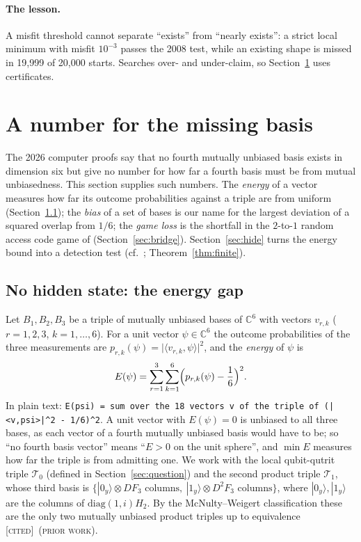 \documentclass[11pt]{article}
\newcommand{\C}{\mathbb{C}}
\newcommand{\ip}[2]{\langle #1,#2\rangle}
\newcommand{\abs}[1]{\lvert #1\rvert}
\newcommand{\Tz}{\mathcal{T}_0}          %
\newcommand{\To}{\mathcal{T}_1}          %
\newcommand{\E}{E}                       %
\newcommand{\st}[1]{\textsc{[#1]}}
\newcommand{\stcited}{\st{cited}}
\newcommand{\prior}{\textsc{(prior work)}}
\theoremstyle{definition}
\theoremstyle{remark}
\begin{document}
\paragraph{The lesson.} A misfit threshold cannot separate ``exists'' from ``nearly exists'': a strict local minimum with
misfit $10^{-3}$ passes the 2008 test, while an existing shape is missed in 19{,}999 of 20{,}000 starts. Searches over- and
under-claim, so Section~\ref{sec:number} uses certificates.

\section{A number for the missing basis}\label{sec:number}

The 2026 computer proofs say that no fourth mutually unbiased basis exists in dimension six but give no
number for how far a fourth basis must be from mutual unbiasedness. This section supplies such numbers. The
\emph{energy} of a vector measures how far its outcome probabilities against a triple are from uniform
(Section~\ref{sec:gap}); the \emph{bias} of a set of bases is our name for the largest deviation of a squared overlap
from $1/6$; the \emph{game loss} is the shortfall in the $2$-to-$1$ random access code game of \cite{ABMP}
(Section~\ref{sec:bridge}). Section~\ref{sec:hide} turns the energy bound into a detection test
(cf.\ \cite{GMMP17}; Theorem~\ref{thm:finite}).

\subsection{No hidden state: the energy gap}\label{sec:gap}

{\raggedright Let $B_1,B_2,B_3$ be a triple of mutually unbiased bases of $\C^6$ with vectors $v_{r,k}$ ($r=1,2,3$,
$k=1,\dots,6$). For a unit vector $\psi\in\C^6$ the outcome probabilities of the three measurements are
$p_{r,k}(\psi)=\abs{\ip{v_{r,k}}{\psi}}^2$, and the \emph{energy} of $\psi$ is
\[
  \E(\psi)=\sum_{r=1}^{3}\sum_{k=1}^{6}\Bigl(p_{r,k}(\psi)-\frac16\Bigr)^2 .
\]
In plain text: \texttt{E(psi) = sum over the 18 vectors v of the triple of (|<v,psi>|\textasciicircum2 -~1/6)\textasciicircum2}.
A unit vector with $\E(\psi)=0$ is unbiased to all three bases, as each vector of a fourth mutually
unbiased basis would have to be; so ``no fourth basis vector'' means ``$\E>0$ on the unit
sphere'', and $\min\E$ measures how far the triple is from admitting one. We work with the local qubit-qutrit triple $\Tz$ (defined in Section~\ref{sec:question}) and the second product triple $\To$,
whose third basis is $\{|0_y\rangle\otimes DF_3\text{ columns},\ |1_y\rangle\otimes D^2F_3\text{ columns}\}$, where
$|0_y\rangle,|1_y\rangle$ are the columns of $\mathrm{diag}(1,i)H_2$.
By the McNulty--Weigert classification these are the only two mutually unbiased product triples up to equivalence
\cite{MWreview,MW12} \stcited\ \prior.\par}
\end{document}
